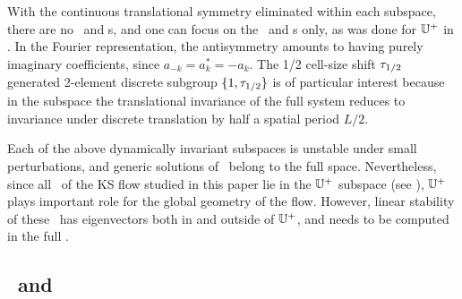 \PCedit{
While in general the bilinear term $(u^2)_x$  mixes the
irreducible subspaces of $D_n$, for $D_2$ there are
four subspaces invariant under the flow\rf{KNSks90}:
\begin{romannum} %
 \item[$\{0\}$:~~~~~~] the $u(x)=0$ {\eqv}
 \item[$\bbU^+ = \bbU^{(1)}+ \bbU^{(3)} $:]
    the reflection $D_1$ irreducible space of antisymmetric $u(x)$
 \item[$\bbU^S =  \bbU^{(1)}+ \bbU^{(2)}$:]
    the shift $D_1$ irreducible space of $L/2$ shift symmetric  $u(x)$
 \item[$\bbU^{(1)}$:~~~~~]
    the $D_2$ irreducible  space of $u(x)$ invariant under $x\mapsto L/2-x,\ u\mapsto -u$
\end{romannum} %
as long as all other components of $u(x)$ are
set to zero (see for example \refeq{KSU+}).
        } %
With the continuous
translational symmetry eliminated within each subspace, there are no
\reqva\ and \rpo s, and one
can focus on the \eqva\ and \po s only, as was done
for $\bbU^+$ in .
In the Fourier
representation, the
antisymmetry amounts to having purely imaginary
coefficients, since $a_{-k}= a^\ast_k = -a_k$.
The 1/2 cell-size shift $\tau_{1/2}$
generated 2-element discrete subgroup
$\{1,\tau_{1/2}\}$ is
of particular interest
because in the
\PCedit{
$\bbU^+$
       }
subspace the translational invariance of the full system reduces to
invariance under discrete translation  by half a
spatial period $L/2$.

Each of the above dynamically invariant subspaces is unstable
under small perturbations, and generic solutions of \KSe\ belong to
the full space.
Nevertheless, since  all \eqva\ of the KS flow studied in this paper
lie in the $\bbU^+$ subspace (see
), $\bbU^+$  plays important role for the global
geometry of the flow.
However, linear stability of these \eqva\ has
eigenvectors both in and outside of $\bbU^+$, and needs to be
computed in the full \statesp.



\subsection{\Eqva\ and \reqva} %
\label{sec:stks}

